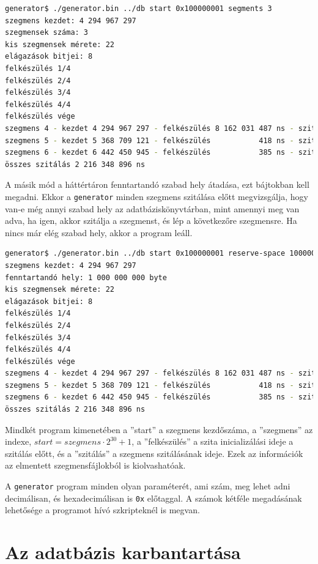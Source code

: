 \begin{lstlisting}[language=bash]
generator$ ./generator.bin ../db start 0x100000001 segments 3
szegmens kezdet: 4 294 967 297
szegmensek száma: 3
kis szegmensek mérete: 22
elágazások bitjei: 8
felkészülés 1/4
felkészülés 2/4
felkészülés 3/4
felkészülés 4/4
felkészülés vége
szegmens 4 - kezdet 4 294 967 297 - felkészülés 8 162 031 487 ns - szitálás 729 914 370 ns
szegmens 5 - kezdet 5 368 709 121 - felkészülés           418 ns - szitálás 736 412 117 ns
szegmens 6 - kezdet 6 442 450 945 - felkészülés           385 ns - szitálás 750 022 409 ns
összes szitálás 2 216 348 896 ns
\end{lstlisting}

A másik mód a háttértáron fenntartandó szabad hely átadása, ezt bájtokban kell megadni.
Ekkor a \texttt{generator} minden szegmens szitálása előtt megvizsgálja, hogy van-e még annyi szabad hely az adatbáziskönyvtárban, mint amennyi meg van adva, ha igen, akkor szitálja a szegmenst,
és lép a következőre szegmensre. Ha nincs már elég szabad hely, akkor a program leáll.

\begin{lstlisting}[language=bash]
generator$ ./generator.bin ../db start 0x100000001 reserve-space 1000000000
szegmens kezdet: 4 294 967 297
fenntartandó hely: 1 000 000 000 byte 
kis szegmensek mérete: 22
elágazások bitjei: 8
felkészülés 1/4
felkészülés 2/4
felkészülés 3/4
felkészülés 4/4
felkészülés vége
szegmens 4 - kezdet 4 294 967 297 - felkészülés 8 162 031 487 ns - szitálás 729 914 370 ns
szegmens 5 - kezdet 5 368 709 121 - felkészülés           418 ns - szitálás 736 412 117 ns
szegmens 6 - kezdet 6 442 450 945 - felkészülés           385 ns - szitálás 750 022 409 ns
összes szitálás 2 216 348 896 ns
\end{lstlisting}

Mindkét program kimenetében a ''start'' a szegmens kezdőszáma, a ''szegmens'' az indexe,
$start=szegmens \cdot 2^{30}+1$, a ''felkészülés'' a szita inicializálási ideje a szitálás előtt,
és a ''szitálás'' a szegmens szitálásának ideje.
Ezek az információk az elmentett szegmensfájlokból is kiolvashatóak.

A \texttt{generator} program minden olyan paraméterét, ami szám, meg lehet adni decimálisan, és hexadecimálisan is \texttt{0x} előtaggal.
A számok kétféle megadásának lehetősége a  programot hívó szkripteknél is megvan.

\section{Az adatbázis karbantartása}

